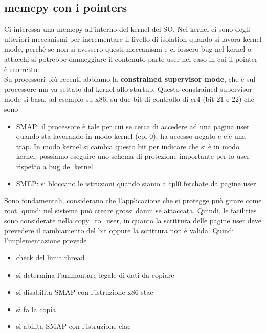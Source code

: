 \documentclass[12pt, oneside]{extbook}
\begin{document}
\subsection{memcpy con i pointers}
Ci interessa una memcpy all'interno del kernel del SO. Nei kernel ci sono degli ulteriori meccanismi per incrementare il livello di isolation quando si lavora kernel mode, perché se non si avessero questi meccanismi e ci fossero bug nel kernel o attacchi si potrebbe danneggiare il contenuto parte user nel caso in cui il pointer è scorretto.\\Su processori più recenti abbiamo la \textbf{constrained supervisor mode}, che è sul processore ma va settato dal kernel allo startup. Questo constrained supervisor mode si basa, ad esempio su x86, su due bit di controllo di cr4 (bit 21 e 22) che sono
\begin{itemize}
\item SMAP: il processore è tale per cui se cerca di accedere ad una pagina user quando sta lavorando in modo kernel (cpl 0), ha accesso negato e c'è una trap. In modo kernel si cambia questo bit per indicare che si è in modo kernel, possiamo eseguire uno schema di protezione importante per lo user rispetto a bug del kernel
\item SMEP: si bloccano le istruzioni quando siamo a cpl0 fetchate da pagine user.
\end{itemize}
Sono fondamentali, considerano che l'applicazione che si protegge può girare come root, quindi nel sistema può creare grossi danni se attaccata.
Quindi, le facilities sono considerate nella copy\_to\_user, in quanto la scrittura delle pagine user deve prevedere il cambiamento del bit oppure la scrittura non è valida. Quindi l'implementazione prevede
\begin{itemize}
\item check del limit thread
\item si determina l'ammontare legale di dati da copiare
\item si disabilita SMAP con l'istruzione x86 \textsf{stac}
\item si fa la copia
\item si abilita SMAP con l'istruzione \textsf{clac}
\end{itemize}
\end{document}
